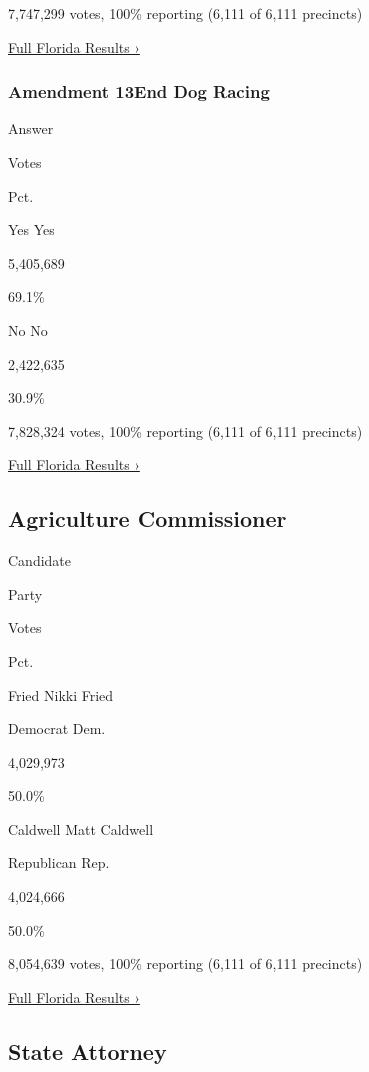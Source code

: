 7,747,299 votes, 100\% reporting (6,111 of 6,111 precincts)

\href{https://www.nytimes3xbfgragh.onion/interactive/2018/11/06/us/elections/results-florida-elections.html}{Full
Florida Results ›}

\hypertarget{amendment-13end-dog-racing}{%
\subsubsection{Amendment 13End Dog
Racing}\label{amendment-13end-dog-racing}}

Answer

Votes

Pct.

 Yes Yes

5,405,689

69.1\%

 No No

2,422,635

30.9\%

7,828,324 votes, 100\% reporting (6,111 of 6,111 precincts)

\href{https://www.nytimes3xbfgragh.onion/interactive/2018/11/06/us/elections/results-florida-elections.html}{Full
Florida Results ›}

\hypertarget{agriculture-commissioner}{%
\subsection{Agriculture Commissioner}\label{agriculture-commissioner}}

Candidate

Party

Votes

Pct.

 Fried Nikki Fried

Democrat Dem.

4,029,973

50.0\%

 Caldwell Matt Caldwell

Republican Rep.

4,024,666

50.0\%

8,054,639 votes, 100\% reporting (6,111 of 6,111 precincts)

\href{https://www.nytimes3xbfgragh.onion/interactive/2018/11/06/us/elections/results-florida-elections.html}{Full
Florida Results ›}

\hypertarget{state-attorney}{%
\subsection{State Attorney}\label{state-attorney}}

